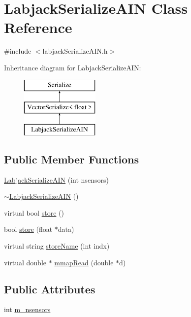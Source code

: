 \hypertarget{classLabjackSerializeAIN}{\section{Labjack\-Serialize\-A\-I\-N Class Reference}
\label{classLabjackSerializeAIN}
}


{\ttfamily \#include $<$labjack\-Serialize\-A\-I\-N.\-h$>$}

Inheritance diagram for Labjack\-Serialize\-A\-I\-N\-:\begin{figure}[H]
\begin{center}
\leavevmode
\includegraphics[height=3.000000cm]{classLabjackSerializeAIN}
\end{center}
\end{figure}
\subsection*{Public Member Functions}
\begin{DoxyCompactItemize}
\item 
\hyperlink{classLabjackSerializeAIN_a5e6b1444fe9a1dfe27bad2ed84ee7778}{Labjack\-Serialize\-A\-I\-N} (int nsensors)
\item 
\hyperlink{classLabjackSerializeAIN_a89569122c21dc473fcb0cebda38a0172}{$\sim$\-Labjack\-Serialize\-A\-I\-N} ()
\item 
virtual bool \hyperlink{classLabjackSerializeAIN_a12e5f38cd48f38578f46e8cc90576a93}{store} ()
\item 
bool \hyperlink{classLabjackSerializeAIN_a93f06711fe647e87fa026361640badcb}{store} (float $\ast$data)
\item 
virtual string \hyperlink{classLabjackSerializeAIN_a8ff8a30e23acb11137baab14e47b1d4a}{store\-Name} (int indx)
\item 
virtual double $\ast$ \hyperlink{classLabjackSerializeAIN_a5b64792931481c509eb0c2bb86dbc99a}{mmap\-Read} (double $\ast$d)
\end{DoxyCompactItemize}
\subsection*{Public Attributes}
\begin{DoxyCompactItemize}
\item 
int \hyperlink{classLabjackSerializeAIN_a85aea591bf54bc75577a2a090ce89369}{m\-\_\-nsensors}
\end{DoxyCompactItemize}


